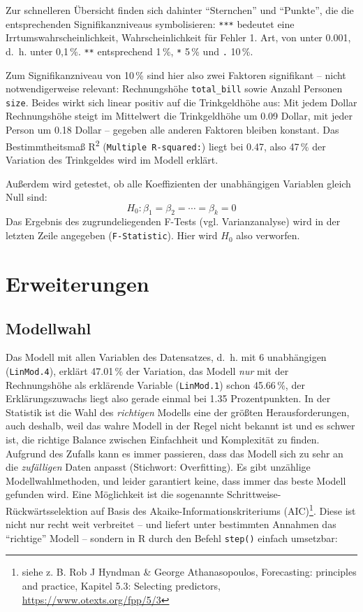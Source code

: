 \documentclass[12pt,ngerman,paper=a4,pagesize,DIV=13]{scrreprt}
\begin{document}
Zur schnelleren Übersicht finden sich dahinter \enquote{Sternchen} und
\enquote{Punkte}, die die entsprechenden Signifikanzniveaus
symbolisieren: \texttt{***} bedeutet eine Irrtumswahrscheinlichkeit,
Wahrscheinlichkeit für Fehler 1. Art, von unter 0.001, d.~h. unter
0,1\(\,\)\%. \texttt{**} entsprechend 1\(\,\)\%, \texttt{*} 5\(\,\)\%
und \texttt{.} 10\(\,\)\%.

Zum Signifikanzniveau von 10\(\,\)\% sind hier also zwei Faktoren
signifikant -- nicht notwendigerweise relevant: Rechnungshöhe
\texttt{total\_bill} sowie Anzahl Personen \texttt{size}. Beides wirkt
sich linear positiv auf die Trinkgeldhöhe aus: Mit jedem Dollar
Rechnungshöhe steigt im Mittelwert die Trinkgeldhöhe um 0.09 Dollar, mit
jeder Person um 0.18 Dollar -- gegeben alle anderen Faktoren bleiben
konstant. Das Bestimmtheitsmaß R\textsuperscript{2}
(\texttt{Multiple\ R-squared:}) liegt bei 0.47, also 47\(\,\)\% der
Variation des Trinkgeldes wird im Modell erklärt.

Außerdem wird getestet, ob alle Koeffizienten der unabhängigen Variablen
gleich Null sind: \[H_0: \beta_1=\beta_2=\cdots=\beta_k=0\] Das Ergebnis
des zugrundeliegenden F-Tests (vgl. Varianzanalyse) wird in der letzten
Zeile angegeben (\texttt{F-Statistic}). Hier wird \(H_0\) also
verworfen.

\hypertarget{erweiterungen}{%
\section{Erweiterungen}\label{erweiterungen}}

\hypertarget{modellwahl}{%
\subsection{Modellwahl}\label{modellwahl}}

Das Modell mit allen Variablen des Datensatzes, d.~h. mit 6 unabhängigen
(\texttt{LinMod.4}), erklärt 47.01\(\,\)\% der Variation, das Modell
\emph{nur} mit der Rechnungshöhe als erklärende Variable
(\texttt{LinMod.1}) schon 45.66\(\,\)\%, der Erklärungszuwachs liegt
also gerade einmal bei 1.35 Prozentpunkten. In der Statistik ist die
Wahl des \emph{richtigen} Modells eine der größten Herausforderungen,
auch deshalb, weil das wahre Modell in der Regel nicht bekannt ist und
es schwer ist, die richtige Balance zwischen Einfachheit und Komplexität
zu finden. Aufgrund des Zufalls kann es immer passieren, dass das Modell
sich zu sehr an die \emph{zufälligen} Daten anpasst (Stichwort:
Overfitting). Es gibt unzählige Modellwahlmethoden, und leider
garantiert keine, dass immer das beste Modell gefunden wird. Eine
Möglichkeit ist die sogenannte Schrittweise-Rückwärtsselektion auf Basis
des Akaike-Informationskriteriums (AIC)\footnote{siehe z. B. Rob J
  Hyndman \& George Athanasopoulos, Forecasting: principles and
  practice, Kapitel 5.3: Selecting predictors,
  \url{https://www.otexts.org/fpp/5/3}}. Diese ist nicht nur recht weit
verbreitet -- und liefert unter bestimmten Annahmen das
\enquote{richtige} Modell -- sondern in R durch den Befehl
\texttt{step()} einfach umsetzbar:
\end{document}
